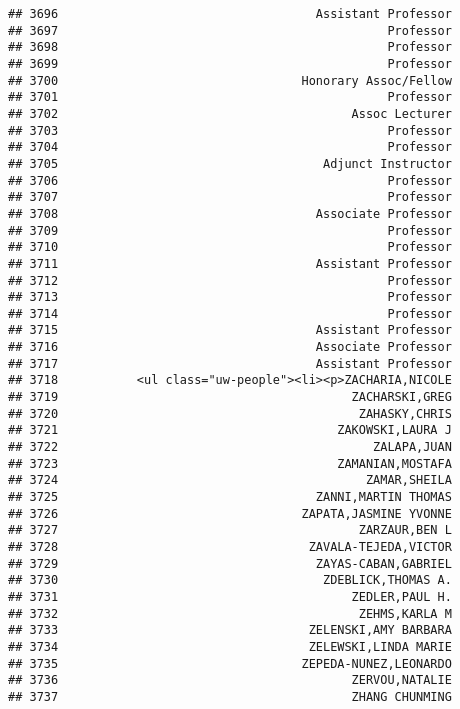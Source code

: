 \documentclass[
]{article}
\begin{document}
\begin{verbatim}
## 3696                                    Assistant Professor
## 3697                                              Professor
## 3698                                              Professor
## 3699                                              Professor
## 3700                                  Honorary Assoc/Fellow
## 3701                                              Professor
## 3702                                         Assoc Lecturer
## 3703                                              Professor
## 3704                                              Professor
## 3705                                     Adjunct Instructor
## 3706                                              Professor
## 3707                                              Professor
## 3708                                    Associate Professor
## 3709                                              Professor
## 3710                                              Professor
## 3711                                    Assistant Professor
## 3712                                              Professor
## 3713                                              Professor
## 3714                                              Professor
## 3715                                    Assistant Professor
## 3716                                    Associate Professor
## 3717                                    Assistant Professor
## 3718           <ul class="uw-people"><li><p>ZACHARIA,NICOLE
## 3719                                         ZACHARSKI,GREG
## 3720                                          ZAHASKY,CHRIS
## 3721                                       ZAKOWSKI,LAURA J
## 3722                                            ZALAPA,JUAN
## 3723                                       ZAMANIAN,MOSTAFA
## 3724                                           ZAMAR,SHEILA
## 3725                                    ZANNI,MARTIN THOMAS
## 3726                                  ZAPATA,JASMINE YVONNE
## 3727                                          ZARZAUR,BEN L
## 3728                                   ZAVALA-TEJEDA,VICTOR
## 3729                                    ZAYAS-CABAN,GABRIEL
## 3730                                     ZDEBLICK,THOMAS A.
## 3731                                         ZEDLER,PAUL H.
## 3732                                          ZEHMS,KARLA M
## 3733                                   ZELENSKI,AMY BARBARA
## 3734                                   ZELEWSKI,LINDA MARIE
## 3735                                  ZEPEDA-NUNEZ,LEONARDO
## 3736                                         ZERVOU,NATALIE
## 3737                                         ZHANG CHUNMING

\end{verbatim}
\end{document}
